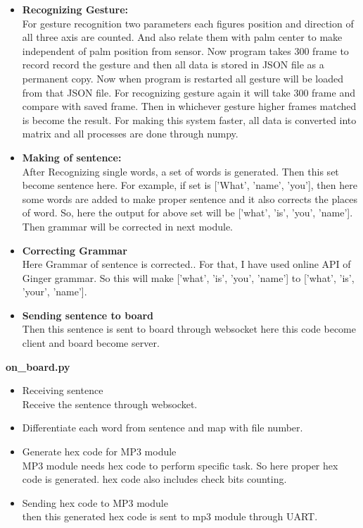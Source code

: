 \documentclass[a4paper,12pt,oneside]{book}
\begin{document}
\begin{itemize}
\item \textbf{Recognizing Gesture:}\\
For gesture recognition two parameters each figures position and direction of all three axis are counted. And also relate them with palm center to make independent of palm position from sensor. Now program takes 300 frame to record record the gesture and then all data is stored in JSON file as a permanent copy. Now when program is restarted all gesture will be loaded from that JSON file. For recognizing gesture again it will take 300 frame and compare with saved frame. Then in whichever gesture higher frames matched is become  the result. For making this system faster, all data is converted into matrix and all processes are done through numpy. 
\item \textbf{Making of sentence:}\\
After Recognizing single words, a set of words is generated. Then this set become sentence here. For example, if set is ['What', 'name', 'you'], then here some words are added to make proper sentence and it also corrects the places of word. So, here the output for above set will be ['what', 'is', 'you', 'name']. Then grammar will be corrected in next module.
\item \textbf{Correcting Grammar}\\
Here Grammar of sentence is corrected.. For that, I have used online API of Ginger grammar. So this will make ['what', 'is', 'you', 'name'] to ['what', 'is', 'your', 'name'].
\item \textbf{Sending sentence to board}\\
Then this sentence is sent to board through websocket here this code become client and board become server.
\end{itemize}
\textbf{\Large{on\_board.py}}
\begin{itemize}
\item Receiving sentence\\
Receive the sentence through websocket.
\item Differentiate each word from sentence and map with file number.
\item Generate hex code for MP3 module\\
MP3 module needs hex code to perform specific task. So here proper hex code is generated. hex code also includes check bits counting.
\item Sending hex code to MP3 module\\
then this generated hex code is sent to mp3 module through UART.
\end{itemize}
\end{document}
